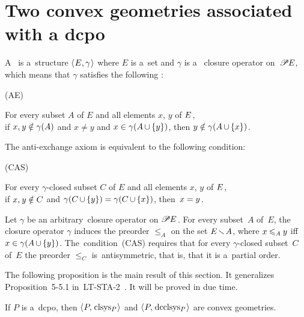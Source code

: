 \documentclass[11pt,letterpaper]{article}
\renewcommand{\thmskip}{\bigskip}
\begin{document}
\section{Two convex geometries associated with a dcpo}
\label{sec:conv-geoms-assoc-with-dcpo}

A~ is a~structure $\langle\mspace{1mu} E,\gamma \mspace{1mu}\rangle$
where $E$ is a~set and $\gamma$ is a~ closure operator on~$\mathscr{P}\mspace{-1mu} E$,
which means that $\gamma$ satisfies the following :
\begin{items}{(AE)\:}
\item[(AE)\:] For every subset $A$ of $E$ and all elements $x$, $y$ of $E\mspace{1mu}$,\\
	if $x,\mspace{1mu} y\notin \gamma(A)$ and $x\neq y$
		and $x\in\gamma(A\mspace{-1mu}\cup\mspace{-1mu}\{ y \})\mspace{1mu}$,
	then $y\notin\gamma(A\mspace{-1mu}\cup\mspace{-1mu}\{ x \})\mspace{1mu}$.
\end{items}%
%
\pagebreak[3]
\noindent The anti-exchange axiom is equivalent to the following condition:
%
\begin{items}{(CAS)\:}
\item[(CAS)\:] For every $\gamma$-closed subset $C$ of $E$ and all elements $x$, $y$ of $E\mspace{1mu}$,\\
	if $x,\mspace{1mu} y\notin C$
		and $\gamma(C\mspace{-1mu}\cup\mspace{-1mu}\{ y \})=\gamma(C\mspace{-1mu}\cup\mspace{-1mu}\{ x \})$,
	then~$x=y\mspace{1mu}$.
\end{items}%
%
\noindent Let $\gamma$ be an arbitrary~closure operator on $\mathscr{P}\mspace{-1mu} E\mspace{1mu}$.
For every subset~$A$ of~$E$,
the closure operator $\gamma$ induces the preorder  $\leq_A$ on the set $E\mspace{-2mu}\mathbin{\smallsetminus}\mspace{-2mu} A$,
	where $x\mspace{-1mu}\leqslant_A\mspace{-1mu} y$ iff $x\in\gamma(A\mspace{-1mu}\cup\mspace{-1mu}\{ y \})$.
The~condition~(CAS) requires that for every $\gamma$-closed subset~$C$ of~$E$
	the preorder $\leq_C$ is~anti\-symmetric, that is, that it is a~partial order.

\txtskip

The following proposition is the main result of this section.
It generalizes Proposition~5-5.1 in~LT-STA-2~\cite{LT-STA-2}.
It will be proved in due time.

\thmskip

\begin{proposition}\label{prop:dcpo-P==>(P,clsysP)-(P,dcclsysP)-convex-geoms}
If\/ $P$ is a~dcpo,
then\/ $\langle\mspace{1mu} P,\mspace{2mu}\mathop{\smash{\mathrm{clsys}}}\nolimits_P \mspace{1mu}\rangle$ and\/ $\langle\mspace{1mu} P,\mspace{2mu}\mathop{\smash{\mathrm{dcclsys}}}\nolimits_P \mspace{1mu}\rangle$ are convex geometries.
\end{proposition}
\end{document}
